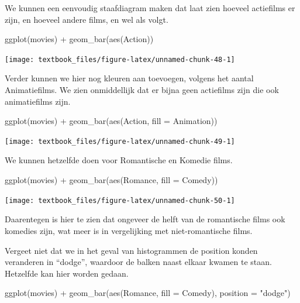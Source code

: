 \documentclass[]{tufte-book}
\newenvironment{Shaded}{}{}
\newcommand{\AttributeTok}[1]{\textcolor[rgb]{0.49,0.56,0.16}{#1}}
\newcommand{\FunctionTok}[1]{\textcolor[rgb]{0.02,0.16,0.49}{#1}}
\newcommand{\NormalTok}[1]{#1}
\newcommand{\SpecialCharTok}[1]{\textcolor[rgb]{0.25,0.44,0.63}{#1}}
\newcommand{\StringTok}[1]{\textcolor[rgb]{0.25,0.44,0.63}{#1}}
\begin{document}
We kunnen een eenvoudig staafdiagram maken dat laat zien hoeveel actiefilms er zijn, en hoeveel andere films, en wel als volgt.

\begin{Shaded}
\begin{Highlighting}[]
\FunctionTok{ggplot}\NormalTok{(movies) }\SpecialCharTok{+}
  \FunctionTok{geom\_bar}\NormalTok{(}\FunctionTok{aes}\NormalTok{(Action))}
\end{Highlighting}
\end{Shaded}

\texttt{[image: textbook\_files/figure-latex/unnamed-chunk-48-1]}

Verder kunnen we hier nog kleuren aan toevoegen, volgens het aantal Animatiefilms. We zien onmiddellijk dat er bijna geen actiefilms zijn die ook animatiefilms zijn.

\begin{Shaded}
\begin{Highlighting}[]
\FunctionTok{ggplot}\NormalTok{(movies) }\SpecialCharTok{+}
  \FunctionTok{geom\_bar}\NormalTok{(}\FunctionTok{aes}\NormalTok{(Action, }\AttributeTok{fill =}\NormalTok{ Animation))}
\end{Highlighting}
\end{Shaded}

\texttt{[image: textbook\_files/figure-latex/unnamed-chunk-49-1]}

We kunnen hetzelfde doen voor Romantische en Komedie films.

\begin{Shaded}
\begin{Highlighting}[]
\FunctionTok{ggplot}\NormalTok{(movies) }\SpecialCharTok{+}
  \FunctionTok{geom\_bar}\NormalTok{(}\FunctionTok{aes}\NormalTok{(Romance, }\AttributeTok{fill =}\NormalTok{ Comedy))}
\end{Highlighting}
\end{Shaded}

\texttt{[image: textbook\_files/figure-latex/unnamed-chunk-50-1]}

Daarentegen is hier te zien dat ongeveer de helft van de romantische films ook komedies zijn, wat meer is in vergelijking met niet-romantische films.

Vergeet niet dat we in het geval van histogrammen de position konden veranderen in ``dodge'', waardoor de balken naast elkaar kwamen te staan. Hetzelfde kan hier worden gedaan.

\begin{Shaded}
\begin{Highlighting}[]
\FunctionTok{ggplot}\NormalTok{(movies) }\SpecialCharTok{+}
  \FunctionTok{geom\_bar}\NormalTok{(}\FunctionTok{aes}\NormalTok{(Romance, }\AttributeTok{fill =}\NormalTok{ Comedy), }\AttributeTok{position =} \StringTok{"dodge"}\NormalTok{)}
\end{Highlighting}
\end{Shaded}
\end{document}
